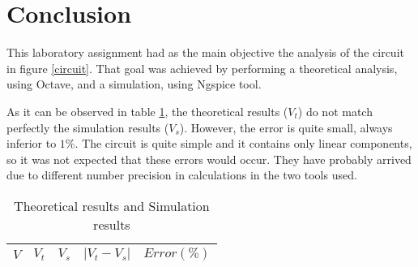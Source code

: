 \section{Conclusion}
\label{sec:conclusion}

This laboratory assignment had as the main objective the analysis of the circuit in figure \ref{circuit}. That goal was achieved by performing a theoretical analysis, using Octave, and a simulation, using Ngspice tool.

As it can be observed in table \ref{error_res}, the theoretical results ($V_t$) do not match perfectly the simulation results ($V_s$). However, the error is quite small, always inferior to $1\%$. The circuit is quite simple and it contains only linear components, so it was not expected that these errors would occur. They have probably arrived due to different number precision in calculations in the two tools used.


\begin{table}[H]
  \centering
  \begin{tabular}{|c|c|c|c|c|}
    \hline
        $V$ & $V_t$ & $V_s$ & $|V_t-V_s|$ & $Error (\%)$ \\
        \hline
        \hline
        
        \hline
  \end{tabular}
  \caption{Theoretical results and Simulation results}
  \label{error_res}
\end{table}   
